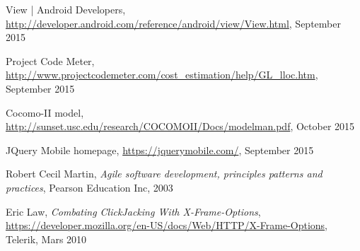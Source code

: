 \begin{thebibliography}{9}
	View | Android Developers,
	\url{http://developer.android.com/reference/android/view/View.html},
	September 2015	
	
	Project Code Meter, 
	\url{http://www.projectcodemeter.com/cost_estimation/help/GL_lloc.htm},
	September 2015

	Cocomo-II model,
	\url{http://sunset.usc.edu/research/COCOMOII/Docs/modelman.pdf},
	October 2015

	JQuery Mobile homepage,
	\url{https://jquerymobile.com/},
	September 2015

	Robert Cecil Martin,
	\emph{Agile software development, principles patterns and practices},
	Pearson Education Inc,
	2003	

	Eric Law,
	\emph{Combating ClickJacking With X-Frame-Options},
	\url{https://developer.mozilla.org/en-US/docs/Web/HTTP/X-Frame-Options},
	Telerik,
	Mars 2010
\end{thebibliography}
